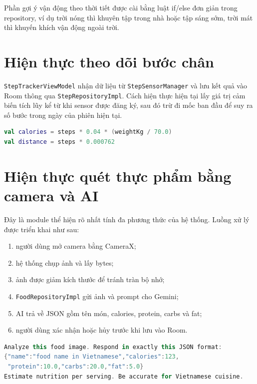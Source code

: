 \documentclass{zenbuddy-report}
\begin{document}
Phần gợi ý vận động theo thời tiết được cài bằng luật if/else đơn giản trong repository, ví dụ trời nóng thì khuyên tập trong nhà hoặc tập sáng sớm, trời mát thì khuyến khích vận động ngoài trời.

\section{Hiện thực theo dõi bước chân}
\texttt{StepTrackerViewModel} nhận dữ liệu từ \texttt{StepSensorManager} và lưu kết quả vào Room thông qua \texttt{StepRepositoryImpl}. Cách hiện thực hiện tại lấy giá trị cảm biến tích lũy kể từ khi sensor được đăng ký, sau đó trừ đi mốc ban đầu để suy ra số bước trong ngày của phiên hiện tại.

\begin{lstlisting}[language=Kotlin,caption={Công thức tính calories và quãng đường từ số bước},label={lst:step-formula}]
val calories = steps * 0.04 * (weightKg / 70.0)
val distance = steps * 0.000762
\end{lstlisting}


\section{Hiện thực quét thực phẩm bằng camera và AI}
Đây là module thể hiện rõ nhất tính đa phương thức của hệ thống. Luồng xử lý được triển khai như sau:
\begin{enumerate}
  \item người dùng mở camera bằng CameraX;
  \item hệ thống chụp ảnh và lấy bytes;
  \item ảnh được giảm kích thước để tránh tràn bộ nhớ;
  \item \texttt{FoodRepositoryImpl} gửi ảnh và prompt cho Gemini;
  \item AI trả về JSON gồm tên món, calories, protein, carbs và fat;
  \item người dùng xác nhận hoặc hủy trước khi lưu vào Room.
\end{enumerate}

\begin{lstlisting}[language=Kotlin,caption={Trích đoạn prompt nhận diện thực phẩm trong repository},label={lst:food-prompt}]
Analyze this food image. Respond in exactly this JSON format:
{"name":"food name in Vietnamese","calories":123,
 "protein":10.0,"carbs":20.0,"fat":5.0}
Estimate nutrition per serving. Be accurate for Vietnamese cuisine.
\end{lstlisting}
\end{document}
